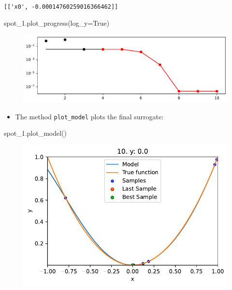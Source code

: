 \documentclass[
  letterpaper,
  DIV=11,
  numbers=noendperiod]{scrreprt}
\newenvironment{Shaded}{\begin{snugshade}}{\end{snugshade}}
\newcommand{\NormalTok}[1]{\textcolor[rgb]{0.00,0.23,0.31}{#1}}
\newcommand{\OperatorTok}[1]{\textcolor[rgb]{0.37,0.37,0.37}{#1}}
\newcommand{\VariableTok}[1]{\textcolor[rgb]{0.07,0.07,0.07}{#1}}
\providecommand{\tightlist}{%
  \setlength{\itemsep}{0pt}\setlength{\parskip}{0pt}}\usepackage{longtable,booktabs,array}
\begin{document}
\begin{verbatim}
[['x0', -0.00014760259016366462]]
\end{verbatim}

\begin{Shaded}
\begin{Highlighting}[]
\NormalTok{spot\_1.plot\_progress(log\_y}\OperatorTok{=}\VariableTok{True}\NormalTok{)}
\end{Highlighting}
\end{Shaded}

\begin{figure}[H]

{\centering \includegraphics{010_num_spot_sklearn_surrogate_files/figure-pdf/cell-23-output-1.pdf}

}

\end{figure}

\begin{itemize}
\tightlist
\item
  The method \texttt{plot\_model} plots the final surrogate:
\end{itemize}

\begin{Shaded}
\begin{Highlighting}[]
\NormalTok{spot\_1.plot\_model()}
\end{Highlighting}
\end{Shaded}

\begin{figure}[H]

{\centering \includegraphics{010_num_spot_sklearn_surrogate_files/figure-pdf/cell-24-output-1.pdf}

}

\end{figure}
\end{document}
